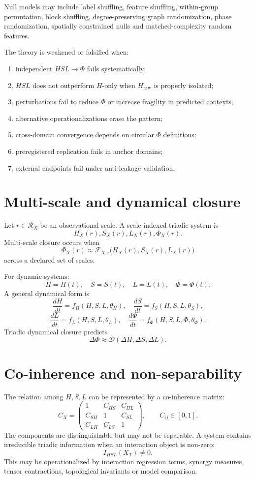 \documentclass[11pt,a4paper]{article}
\newcommand{\Hraw}{H_{\mathrm{raw}}}
\begin{document}
Null models may include label shuffling, feature shuffling, within-group permutation, block shuffling, degree-preserving graph randomization, phase randomization, spatially constrained nulls and matched-complexity random features.

The theory is weakened or falsified when:
\begin{enumerate}
\item independent $HSL\rightarrow\Phi$ fails systematically;
\item $HSL$ does not outperform $H$-only when $\Hraw$ is properly isolated;
\item perturbations fail to reduce $\Phi$ or increase fragility in predicted contexts;
\item alternative operationalizations erase the pattern;
\item cross-domain convergence depends on circular $\Phi$ definitions;
\item preregistered replication fails in anchor domains;
\item external endpoints fail under anti-leakage validation.
\end{enumerate}

\section{Multi-scale and dynamical closure}

Let $r\in\mathcal{R}_X$ be an observational scale.
A scale-indexed triadic system is
\[
H_X(r),S_X(r),L_X(r),\Phi_X(r).
\]
Multi-scale closure occurs when
\[
\Phi_X(r)\approx\mathcal{F}_{X,r}\big(H_X(r),S_X(r),L_X(r)\big)
\]
across a declared set of scales.

For dynamic systems:
\[
H=H(t),\quad S=S(t),\quad L=L(t),\quad \Phi=\Phi(t).
\]
A general dynamical form is
\[
\frac{dH}{dt}=f_H(H,S,L,\theta_H),\quad
\frac{dS}{dt}=f_S(H,S,L,\theta_S),
\]
\[
\frac{dL}{dt}=f_L(H,S,L,\theta_L),\quad
\frac{d\Phi}{dt}=f_\Phi(H,S,L,\Phi,\theta_\Phi).
\]
Triadic dynamical closure predicts
\[
\Delta\Phi\approx\mathcal{D}(\Delta H,\Delta S,\Delta L).
\]

\section{Co-inherence and non-separability}

The relation among $H,S,L$ can be represented by a co-inherence matrix:
\[
C_X=
\begin{pmatrix}
1&C_{HS}&C_{HL}\\
C_{SH}&1&C_{SL}\\
C_{LH}&C_{LS}&1
\end{pmatrix},
\qquad
C_{ij}\in[0,1].
\]
The components are distinguishable but may not be separable.
A system contains irreducible triadic information when an interaction object is non-zero:
\[
I_{HSL}(X_T)\neq0.
\]
This may be operationalized by interaction regression terms, synergy measures, tensor contractions, topological invariants or model comparison.
\end{document}
